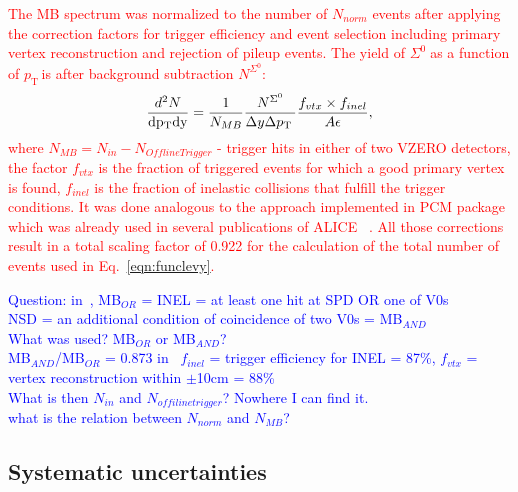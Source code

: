 \documentclass[ALICE,manyauthors]{cernphprep}
\newcommand{\sig}{\ensuremath{\Sigma^0  \; }}
\newcommand{\pt}{\ensuremath{p_{\mathrm{T}\; }}}
\newcommand{\red}{\textcolor{red}}
\newcommand{\blue}{\textcolor{blue}}
\begin{document}
\red{The MB spectrum was normalized to the number of
$N_{norm}$ events after applying the correction factors for trigger efficiency and event selection including primary vertex reconstruction and rejection of pileup events.
The yield of \sig as a function of \pt is after background subtraction $N^{\Sigma^0}$:
\begin{equation}
\frac{d^2N}{\rm{d}p_{\rm{T}}\rm{d}y } =   \frac{1}{N_{MB}} \frac{N^{\Sigma^0}}{\Delta y \Delta \pt}
\frac{ f_{vtx} \times f_{inel}}{A \epsilon} ,
\label{eq:normMB}
\end{equation}
where
$N_{MB} = N_{in} - N_{OfflineTrigger}$  - trigger hits in either of two VZERO detectors,
the factor $f_{vtx}$ is the fraction of triggered events for which a good primary vertex is found,
$ f_{inel}$ is the fraction of inelastic collisions that fulfill the trigger conditions.
It was done analogous to the approach implemented in PCM package which
was already  used in several publications of ALICE~\cite{cite:ALICE2015-InclPhot-pp,cite:ALICE-DirPhot2016} .
All those corrections result in a total scaling factor of 0.922 for the calculation of the total number of events used in Eq.~\ref{eqn:funclevy}.}

\blue{Question: 
in~\cite{cite:ALICE2015-InclPhot-pp}, MB$_{OR}$ = INEL = at least one hit at SPD OR one of V0s\\
NSD = an additional condition of coincidence of two V0s = MB$_{AND}$\\
What was used? MB$_{OR}$ or MB$_{AND}$? \\
MB$_{AND}$/MB$_{OR}$ = 0.873
in~\cite{cite:NSD, cite:Xi_c} $f_{inel}$ = trigger efficiency for INEL = 87\%, $f_{vtx}$ = vertex reconstruction within $\pm$10cm = 88\%\\
What is then $N_{in}$ and $N_{offilinetrigger}$? Nowhere I can find it.\\
what is the relation between $N_{norm}$ and $N_{MB}$?}

 \subsection{Systematic uncertainties} 

\label{subsec:systematics}
\end{document}
